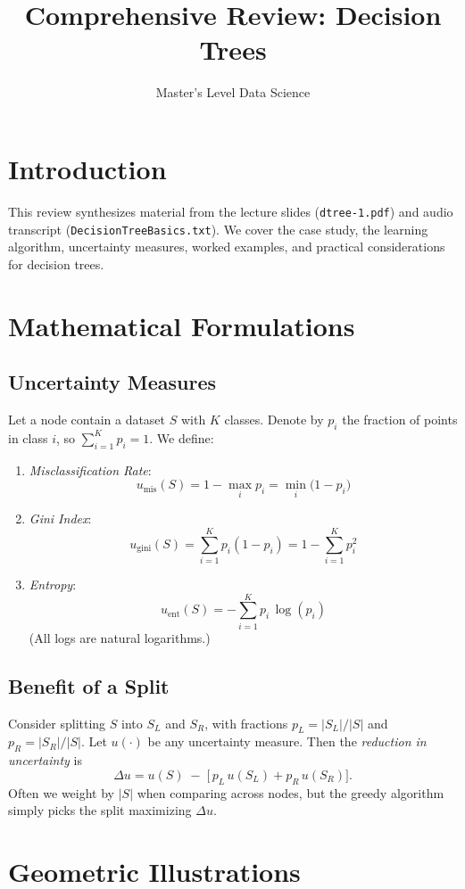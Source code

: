 \documentclass[11pt]{article}
\title{Comprehensive Review: Decision Trees}
\author{Master's Level Data Science}
\date{}
\begin{document}
\maketitle
\tableofcontents
\bigskip

\section{Introduction}
This review synthesizes material from the lecture slides (\texttt{dtree-1.pdf}) and audio transcript (\texttt{DecisionTreeBasics.txt}). We cover the case study, the learning algorithm, uncertainty measures, worked examples, and practical considerations for decision trees.

\section{Mathematical Formulations}
\subsection{Uncertainty Measures}
Let a node contain a dataset $S$ with $K$ classes. Denote by $p_i$ the fraction of points in class $i$, so $\sum_{i=1}^K p_i = 1$. We define:

\begin{enumerate}
  \item \emph{Misclassification Rate}:
  \[
    u_{\mathrm{mis}}(S)
    = 1 - \max_{i} p_i
    = \min_{i}\bigl(1 - p_i\bigr)
  \]
  \item \emph{Gini Index}:
  \[
    u_{\mathrm{gini}}(S)
    = \sum_{i=1}^K p_i (1 - p_i)
    = 1 - \sum_{i=1}^K p_i^2
  \]
  \item \emph{Entropy}:
  \[
    u_{\mathrm{ent}}(S)
    = -\sum_{i=1}^K p_i \,\log(p_i)
  \]
  (All logs are natural logarithms.)
\end{enumerate}

\subsection{Benefit of a Split}
Consider splitting $S$ into $S_L$ and $S_R$, with fractions $p_L = |S_L|/|S|$ and $p_R = |S_R|/|S|$. Let $u(\cdot)$ be any uncertainty measure. Then the \emph{reduction in uncertainty} is
\[
  \Delta u 
  = u(S) \;-\; \bigl[\,p_L\,u(S_L) + p_R\,u(S_R)\bigr].
\]
Often we weight by $|S|$ when comparing across nodes, but the greedy algorithm simply picks the split maximizing $\Delta u$.

\section{Geometric Illustrations}
\end{document}
